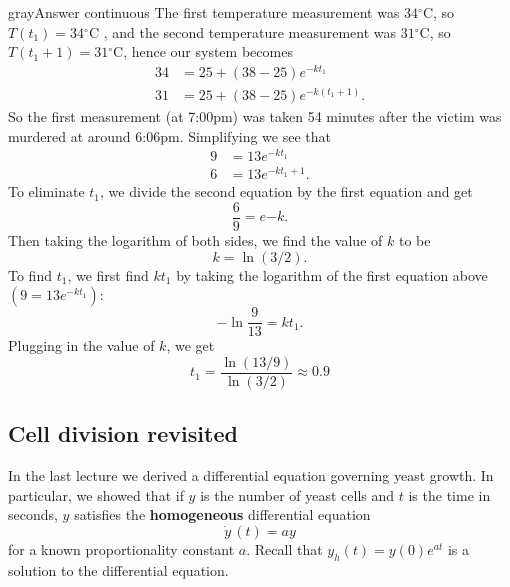 \begin{mybox}{gray}{Answer continuous}
    The first temperature measurement was $34{}^{\circ }\text {C}$, so $T\left(t_{1}\right)=34{}^{\circ }\text {C}$
  , and the second temperature measurement was $31{}^{\circ }\text {C}$,
  so $T\left(t_{1}+1\right)=31{}^{\circ }\text {C}$, hence our system becomes
  \begin{align*}
    \displaystyle  34 &= 25+\left(38-25\right)e^{-kt_1} \\
    \displaystyle 31 &= 25+\left(38-25\right)e^{-k\left(t_1+1\right)}.
  \end{align*}
  So the first measurement (at 7:00pm) was taken 54 minutes after the victim was murdered at around 6:06pm.
    Simplifying we see that
  \begin{align*}
    9 &= 13e^{-kt_1} \\
    6 &= 13e^{-kt_1 + 1}. 
  \end{align*}
  To eliminate $t_1$, we divide the second equation by the first equation and get
  \begin{equation*}
    \frac{6}{9} = e{-k}. 
  \end{equation*}
  Then taking the logarithm of both sides, we find the value of $k$ to be
  \begin{equation*}
    k = \ln (3/2). 
  \end{equation*}
  To find $t_1$, we first find $kt_1$ by taking the logarithm of the first equation above $(9 = 13e^{−kt_1})$:
  \begin{equation*}
    -\ln \frac{9}{13} = kt_1. 
  \end{equation*}
  Plugging in the value of $k$, we get
  \begin{equation*}
    t_1 = \frac{\ln (13/9)}{\ln (3/2)} \approx 0.9
  \end{equation*}
\end{mybox}
\clearpage

\subsection{Cell division revisited}
In the last lecture we derived a differential equation governing yeast growth.
In particular, we showed that if $y$ is the number of yeast cells and $t$ is the time in seconds,
$y$ satisfies the \textbf{homogeneous} differential equation
\begin{equation*}
  \dot{y}\, (t) = ay 
\end{equation*}
for a known proportionality constant $a$. Recall that $y_h(t) = y(0)e^{at}$
is a solution to the differential equation.\\

